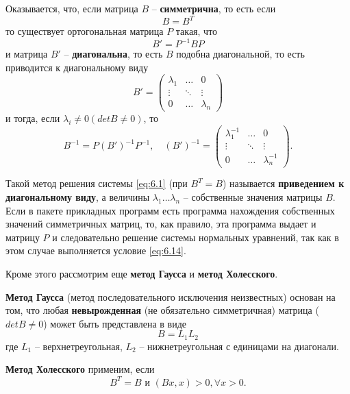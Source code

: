 Оказывается, что, если матрица $B$ -- \textbf{симметрична}, то есть если
\begin{equation} \label{eq:6.14}
	B = B^T
\end{equation}
то существует ортогональная матрица $P$ такая, что
\begin{equation}
	B' = P^{-1}BP
\end{equation}
и матрица $B'$ -- \textbf{диагональна}, то есть $B$ подобна диагональной, то есть приводится к диагональному виду
\begin{equation}
	B' = \begin{pmatrix}
		\lambda_1 & \dots & 0  \\
		\vdots & \ddots & \vdots \\
		0 & \dots & \lambda_n 
	\end{pmatrix}
\end{equation}
и тогда, если $\lambda_i \neq 0 (detB \neq 0)$, то
\begin{equation}
	B^{-1} = P(B')^{-1}P^{-1}, \quad
	(B')^{-1} = \begin{pmatrix}
		\lambda_1^{-1} & \dots & 0  \\
		\vdots & \ddots & \vdots \\
		0 & \dots & \lambda_n^{-1} 
	\end{pmatrix}.
\end{equation}

Такой метод решения системы \ref{eq:6.1} (при $B^T = B$) называется \textbf{приведением к диагональному виду}, а величины $\lambda_1 \dots \lambda_n$ -- собственные значения матрицы $B$. Если в пакете прикладных программ есть программа нахождения собственных значений симметричных матриц, то, как правило, эта программа выдает и матрицу $P$ и следовательно решение системы нормальных уравнений, так как в этом случае выполняется условие \ref{eq:6.14}.

Кроме этого рассмотрим еще \textbf{метод Гаусса} и \textbf{метод Холесского}.

\textbf{Метод Гаусса} (метод последовательного исключения неизвестных) основан на том, что любая \textbf{невырожденная} (не обязательно симметричная) матрица ($detB \neq 0$) может быть представлена в виде
\begin{equation}
	B = L_1L_2
\end{equation}
где $L_1$ -- верхнетреугольная, $L_2$ -- нижнетреугольная с единицами на диагонали.

\textbf{Метод Холесского} применим, если 
\begin{equation} \label{eq:6.19}
	B^T = B \textrm{ и } (Bx, x) > 0, \forall x>0.
\end{equation}

